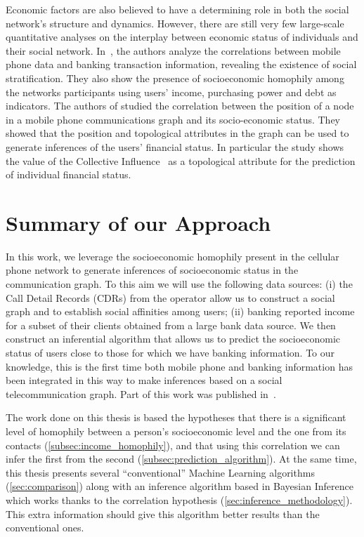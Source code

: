 Economic factors are also believed to have a determining role in both the social network's structure and dynamics. However, there are still very few large-scale quantitative analyses on the interplay between economic status of individuals and their social network. In~\cite{leo2015socioeconomic}, the authors analyze the correlations between mobile phone data and banking transaction information, revealing the existence of social stratification. They also show the presence of socioeconomic homophily among the networks participants using users' income, purchasing power and debt as indicators.
The authors of \cite{Luo2017inferring} studied the correlation between the position of a node in a mobile phone communications graph and its socio-economic status. They showed that the position and topological attributes in the graph can be used to generate inferences of the users' financial status.
In particular the study \cite{Luo2017inferring} shows the value of the Collective Influence~\cite{morone2015influence} as a topological attribute for the prediction of individual financial status.


\section{Summary of our Approach}

In this work, we leverage the socioeconomic homophily present in the cellular phone network to generate inferences of socioeconomic status in the communication graph. To this aim we will use the following data sources: (i) the Call Detail Records (CDRs) from the operator allow us to construct a social graph and to establish social affinities among users; (ii) banking reported income for a subset of their clients obtained from a large bank data source. We then construct an inferential algorithm that allows us to predict the socioeconomic status of users close to those for which we have banking information. To our knowledge, this is the first time both mobile phone and banking information has been integrated in this way to make inferences based on a social telecommunication graph.
Part of this work was published in~\cite{Fixman2016bayesian}.

The work done on this thesis is based the hypotheses that there is a significant level of homophily between a person's socioeconomic level and the one from its contacts (\cref{subsec:income_homophily}), and that using this correlation we can infer the first from the second (\cref{subsec:prediction_algorithm}).
At the same time, this thesis presents several ``conventional'' Machine Learning algorithms (\cref{sec:comparison}) along with an inference algorithm based in Bayesian Inference which works thanks to the correlation hypothesis (\cref{sec:inference_methodology}). This extra information should give this algorithm better results than the conventional ones.

